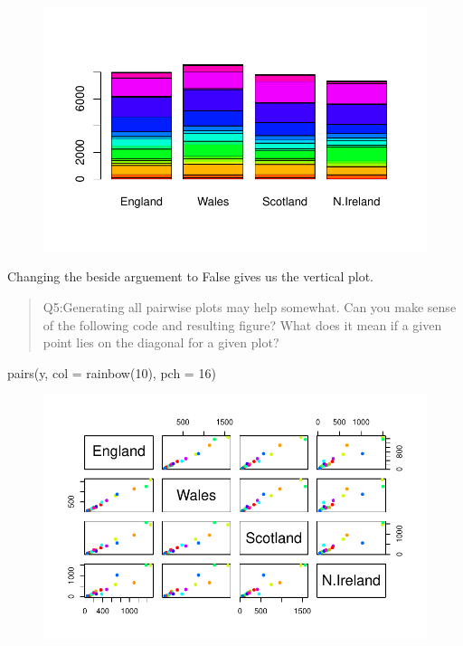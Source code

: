 \documentclass[
  letterpaper,
  DIV=11,
  numbers=noendperiod]{scrartcl}
\newenvironment{Shaded}{\begin{snugshade}}{\end{snugshade}}
\newcommand{\AttributeTok}[1]{\textcolor[rgb]{0.40,0.45,0.13}{#1}}
\newcommand{\DecValTok}[1]{\textcolor[rgb]{0.68,0.00,0.00}{#1}}
\newcommand{\FunctionTok}[1]{\textcolor[rgb]{0.28,0.35,0.67}{#1}}
\newcommand{\NormalTok}[1]{\textcolor[rgb]{0.00,0.23,0.31}{#1}}
\begin{document}
\begin{figure}[H]

{\centering \includegraphics{Class07_files/figure-pdf/unnamed-chunk-17-1.pdf}

}

\end{figure}

Changing the beside arguement to False gives us the vertical plot.

\begin{quote}
Q5:Generating all pairwise plots may help somewhat. Can you make sense
of the following code and resulting figure? What does it mean if a given
point lies on the diagonal for a given plot?
\end{quote}

\begin{Shaded}
\begin{Highlighting}[]
\FunctionTok{pairs}\NormalTok{(y, }\AttributeTok{col =} \FunctionTok{rainbow}\NormalTok{(}\DecValTok{10}\NormalTok{), }\AttributeTok{pch =} \DecValTok{16}\NormalTok{)}
\end{Highlighting}
\end{Shaded}

\begin{figure}[H]

{\centering \includegraphics{Class07_files/figure-pdf/unnamed-chunk-18-1.pdf}

}

\end{figure}
\end{document}
